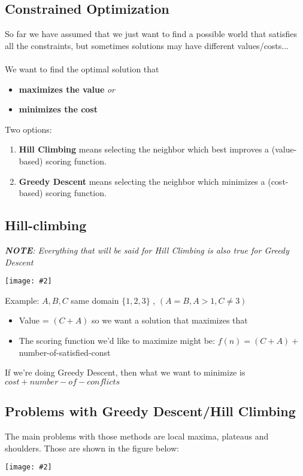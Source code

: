 \documentclass{article}
\def\blu#1{{\color{blu}#1}}
\newcommand{\centerfig}[2]{\begin{center}\texttt{[image: \#2]}\end{center}}
\begin{document}
\subsection*{Constrained Optimization}
So far we have assumed that we just want to find a possible world that satisfies all the constraints, but sometimes solutions may have different values/costs... \\\\
We want to find the optimal solution that
\begin{itemize}
	\item \textbf{maximizes the value} \textit{or}
	\item \textbf{minimizes the cost}
\end{itemize}
Two options:
\begin{enumerate}
	\item \blu{\textbf{Hill Climbing}} means selecting the neighbor which best improves a (value-based) scoring function.
	\item \blu{\textbf{Greedy Descent}} means selecting the neighbor which minimizes a (cost-based) scoring function.
\end{enumerate}

\subsection*{Hill-climbing}
\textit{\textbf{NOTE}: Everything that will be said for Hill Climbing is also true for Greedy Descent}
\centerfig{0.7}{hill-climbing}

\begin{siderules}
	Example: $ A,B,C  $ same domain $ \{1,2,3\} $ , $ (A=B, A>1, C \ne 3) $
	\begin{itemize}
		\item Value = $ (C+A) $ so we want a solution that maximizes that
		\item The scoring function we’d like to maximize might be: $ f(n) = (C + A) + $ number-of-satisfied-const
	\end{itemize}
If we’re doing Greedy Descent, then what we want to minimize is $ cost + number-of-conflicts $

	\end{siderules}

\subsection*{Problems with Greedy Descent/Hill Climbing}
The main problems with those methods are local maxima, plateaus and shoulders. Those are shown in the figure below:
\centerfig{0.8}{problems-1}
\end{document}
